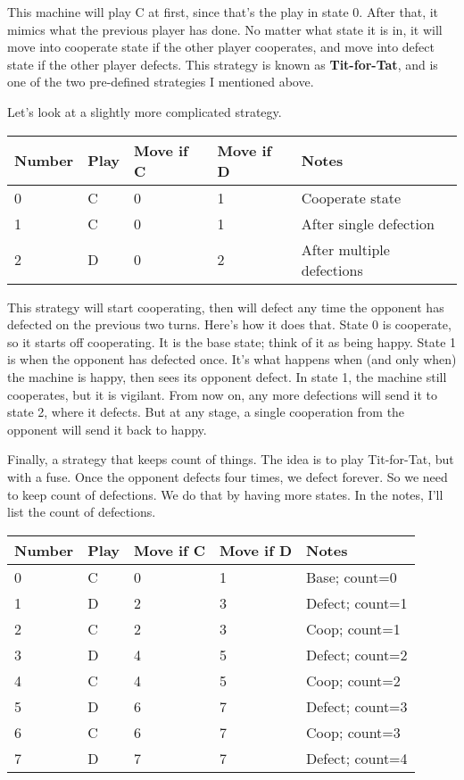 \documentclass[
  11pt,
]{article}
\begin{document}
This machine will play C at first, since that's the play in state 0.
After that, it mimics what the previous player has done. No matter what
state it is in, it will move into cooperate state if the other player
cooperates, and move into defect state if the other player defects. This
strategy is known as \textbf{Tit-for-Tat}, and is one of the two
pre-defined strategies I mentioned above.

Let's look at a slightly more complicated strategy.

\begin{longtable}[]{@{}lllll@{}}
\toprule
Number & Play & Move if C & Move if D & Notes \\
\midrule
\endhead
0 & C & 0 & 1 & Cooperate state \\
1 & C & 0 & 1 & After single defection \\
2 & D & 0 & 2 & After multiple defections \\
\bottomrule
\end{longtable}

This strategy will start cooperating, then will defect any time the
opponent has defected on the previous two turns. Here's how it does
that. State 0 is cooperate, so it starts off cooperating. It is the base
state; think of it as being happy. State 1 is when the opponent has
defected once. It's what happens when (and only when) the machine is
happy, then sees its opponent defect. In state 1, the machine still
cooperates, but it is vigilant. From now on, any more defections will
send it to state 2, where it defects. But at any stage, a single
cooperation from the opponent will send it back to happy.

Finally, a strategy that keeps count of things. The idea is to play
Tit-for-Tat, but with a fuse. Once the opponent defects four times, we
defect forever. So we need to keep count of defections. We do that by
having more states. In the notes, I'll list the count of defections.

\newpage

\begin{longtable}[]{@{}lllll@{}}
\toprule
Number & Play & Move if C & Move if D & Notes \\
\midrule
\endhead
0 & C & 0 & 1 & Base; count=0 \\
1 & D & 2 & 3 & Defect; count=1 \\
2 & C & 2 & 3 & Coop; count=1 \\
3 & D & 4 & 5 & Defect; count=2 \\
4 & C & 4 & 5 & Coop; count=2 \\
5 & D & 6 & 7 & Defect; count=3 \\
6 & C & 6 & 7 & Coop; count=3 \\
7 & D & 7 & 7 & Defect; count=4 \\
\bottomrule
\end{longtable}
\end{document}

